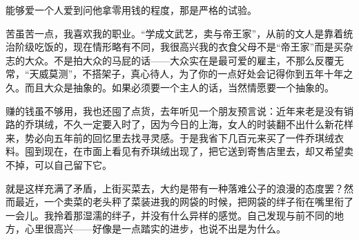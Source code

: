 \par 能够爱一个人爱到问他拿零用钱的程度，那是严格的试验。
\par 苦虽苦一点，我喜欢我的职业。“学成文武艺，卖与帝王家”，从前的文人是靠着统治阶级吃饭的，现在情形略有不同，我很高兴我的衣食父母不是“帝王家”而是买杂志的大众。不是拍大众的马屁的话——大众实在是最可爱的雇主，不那么反覆无常，“天威莫测”，不搭架子，真心待人，为了你的一点好处会记得你到五年十年之久。而且大众是抽象的。如果必须要一个主人的话，当然情愿要一个抽象的。
\par 赚的钱虽不够用，我也还囤了点货，去年听见一个朋友预言说：近年来老是没有销路的乔琪绒，不久一定要入时了，因为今日的上海，女人的时装翻不出什么新花样来，势必向五年前的回忆里去找寻灵感。于是我省下几百元来买了一件乔琪绒衣料。囤到现在，在市面上看见有乔琪绒出现了，把它送到寄售店里去，却又希望卖不掉，可以自己留下它。
\par 就是这样充满了矛盾，上街买菜去，大约是带有一种落难公子的浪漫的态度罢？然而最近，一个卖菜的老头秤了菜装进我的网袋的时候，把网袋的绊子衔在嘴里衔了一会儿。我拎着那湿濡的绊子，并没有什么异样的感觉。自己发现与前不同的地方，心里很高兴——好像是一点踏实的进步，也说不出是为什么。
